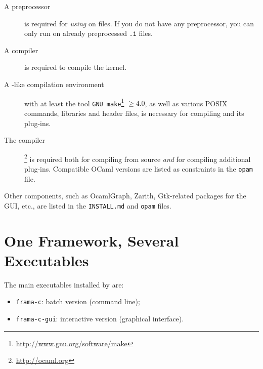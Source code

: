 \begin{description}
\item[A \C preprocessor] is required for \emph{using}
  \FramaC on \C files. If you do not have any \C preprocessor,
  you can only run \FramaC on already preprocessed \texttt{.i} files.
\item[A \C compiler] is required to compile the \FramaC
  kernel.
\item[A -like compilation environment] with at least the tool
  \texttt{GNU make}\footnote{\url{http://www.gnu.org/software/make}} $\ge 4.0$,
  as well as various POSIX commands, libraries and header files, is necessary
  for compiling \FramaC and its plug-ins.
\item[The \caml compiler]\footnote{\url{http://ocaml.org}}
  is required both for compiling \FramaC from source \emph{and} for compiling
  additional plug-ins. Compatible OCaml versions are listed as constraints in
  the \texttt{opam} file.
\end{description}

Other components, such as OcamlGraph, Zarith, Gtk-related packages for the GUI,
etc., are listed in the \texttt{INSTALL.md} and \texttt{opam} files.

\section{One Framework, Several Executables}\label{sec:modes}

The main executables installed by \FramaC are:

\begin{itemize}
\item \texttt{frama-c}: batch version (command line);
\item \texttt{frama-c-gui}: interactive version (graphical interface).
\end{itemize}

